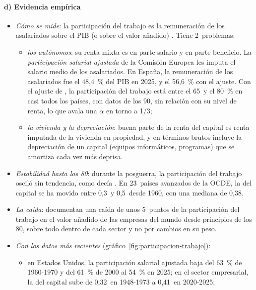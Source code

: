 \documentclass[11pt]{article}
\begin{document}
\paragraph{d) Evidencia empírica}

\begin{itemize}
\item \emph{Cómo se mide}: la participación del trabajo es la remuneración de los asalariados sobre el PIB (o sobre el valor añadido) . Tiene 2~problemas:
  \begin{itemize}
  \item \emph{los autónomos}: su renta mixta es en parte salario y en parte beneficio. La \emph{participación salarial ajustada} de la Comisión Europea les imputa el salario medio de los asalariados. En España, la remuneración de los asalariados fue el 48,4~\% del PIB en 2025\nocite{Eurostat2026Nama10gdp}, y el 56,6~\% con el ajuste\nocite{CE2026AMECO}. Con el ajuste de , la participación del trabajo está entre el 65~y el 80~\% en casi todos los países, con datos de los 90, sin relación con su nivel de renta, lo que avala una $\alpha$ en torno a 1/3\nocite{Gollin2002};
  \item \emph{la vivienda y la depreciación}: buena parte de la renta del capital es renta imputada de la vivienda en propiedad, y en términos brutos incluye la depreciación de un capital (equipos informáticos, programas) que se amortiza cada vez más deprisa\nocite{Rognlie2015}.
  \end{itemize}
\item \emph{Estabilidad hasta los 80}: durante la posguerra, la participación del trabajo osciló sin tendencia, como decía . En 23~países avanzados de la OCDE, la del capital se ha movido entre 0,3~y 0,5~desde 1960, con una mediana de 0,38\nocite{GGDC2025PWT}.
\item \emph{La caída}: \textcite{KarabarbounisNeiman2014} documentan una caída de unos 5~puntos de la participación del trabajo en el valor añadido de las empresas del mundo desde principios de los 80, sobre todo dentro de cada sector y no por cambios en su peso.
\item \emph{Con los datos más recientes} (gráfico~\ref{fig:participacion-trabajo})\nocite{CE2026AMECO}:
  \begin{itemize}
  \item en Estados Unidos, la participación salarial ajustada baja del 63~\% de 1960-1970 y del 61~\% de 2000 al 54~\% en 2025; en el sector empresarial, la del capital sube de 0,32~en 1948-1973 a 0,41~en 2020-2025\nocite{FRBSF2026PTF};

\end{itemize}
\end{itemize}
\end{document}
